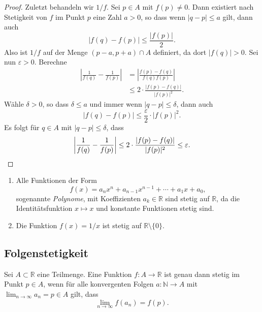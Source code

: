 \documentclass[../main.tex]{subfiles}
\begin{document}
\begin{proof}
  Zuletzt behandeln wir $1/f$.
  Sei $p \in A$ mit $f(p) \neq 0$.
  Dann existiert nach Stetigkeit von
  $f$ im Punkt $p$ eine Zahl $a > 0$, so dass
  wenn $|q - p| \leq a$ gilt,
  dann auch
  \[
  |f(q) - f(p)| \leq \frac{|f(p)|}{2}.
  \]
  Also ist $1/f$ auf der Menge $(p-a, p+a) \cap A$ definiert,
  da dort $|f(q)| > 0$.
  Sei nun $\varepsilon > 0$. 
  Berechne
   \begin{align*}
     \left| \frac{1}{f(q)} - \frac{1}{f(p)} \right| 
     & = \left| \frac{f(p) - f(q)}{f(q)f(p)} \right| \\
     & \leq 2 \cdot \frac{|f(p) - f(q)|}{|f(p)|^2}. 
  \end{align*}
  Wähle $\delta > 0$, so dass $\delta \leq a$ 
  und immer wenn $|q - p| \leq \delta$,
  dann auch 
  \[
    |f(q) - f(p)| \leq \frac{\varepsilon}{2} \cdot |f(p)|^2.
  \]
  Es folgt für $q \in A$ mit $|q - p| \leq \delta$, dass
  \[
    \left| \frac{1}{f(q)}- \frac{1}{f(p)} \right|
    \leq 2 \cdot \frac{|f(p) - f(q)|}{|f(p)|^2} \leq \varepsilon.
    \qedhere
  \]
\end{proof}

\begin{applications}
  \leavevmode
  \begin{enumerate}[(1)]
    \item Alle Funktionen der Form
      \[
        f(x) = a_n x^n + a_{n-1} x^{n-1} + \cdots + a_{1} x + a_0,
      \]
      sogenannte \emph{Polynome},
      mit Koeffizienten $a_k \in \mathbb{R}$ sind stetig
      auf $\mathbb{R}$, da die Identitätsfunktion $x \mapsto x$
      und konstante Funktionen stetig sind.
    \item Die Funktion $f(x) = 1/x$ ist stetig
      auf $\mathbb{R} \setminus \{0\}$.
  \end{enumerate}
\end{applications}

\subsection*{Folgenstetigkeit}
\begin{theorem}
  Sei $A \subset \mathbb{R}$ eine Teilmenge.
  Eine Funktion $f \colon A \to \mathbb{R}$ ist
  genau dann stetig im Punkt
  $p \in A$, wenn für alle
  konvergenten Folgen $a \colon \mathbb{N} \to A$
  mit $\lim_{n \to \infty}a_n = p \in A$ gilt, dass
  \[
    \lim_{n \to \infty} f(a_n) = f(p).
  \]
\end{theorem}
\end{document}

